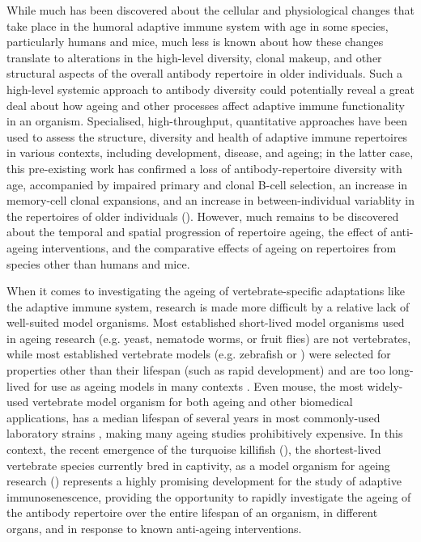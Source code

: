 While much has been discovered about the cellular and physiological changes that take place in the humoral adaptive immune system with age in some species, particularly humans and mice, much less is known about how these changes translate to alterations in the high-level diversity, clonal makeup, and other structural aspects of the overall antibody repertoire in older individuals. Such a high-level systemic approach to antibody diversity could potentially reveal a great deal about how ageing and other processes affect adaptive immune functionality in an organism. Specialised, high-throughput, quantitative approaches \parencite{georgiou2014promise} have been used to assess the structure, diversity and health of adaptive immune repertoires in various contexts, including development, disease, and ageing; in the latter case, this pre-existing work has confirmed a loss of antibody-repertoire diversity with age, accompanied by impaired primary and clonal B-cell selection, an increase in memory-cell clonal expansions, and an increase in between-individual variablity in the repertoires of older individuals (). However, much remains to be discovered about the temporal and spatial progression of repertoire ageing, the effect of anti-ageing interventions, and the comparative effects of ageing on repertoires from species other than humans and mice.

When it comes to investigating the ageing of vertebrate-specific adaptations like the adaptive immune system, research is made more difficult by a relative lack of well-suited model organisms. Most established short-lived model organisms used in ageing research (e.g. yeast, nematode worms, or fruit flies) are not vertebrates, while most established vertebrate models (e.g. zebrafish or ) were selected for properties other than their lifespan (such as rapid development) and are too long-lived for use as ageing models in many contexts \parencite{gerhard2002zebrafish,bowler1977longevity}. Even mouse, the most widely-used vertebrate model organism for both ageing and other biomedical applications, has a median lifespan of several years in most commonly-used laboratory strains \parencite{yuan2009aging}, making many ageing studies prohibitively expensive. In this context, the recent emergence of the turquoise killifish (\nfu), the shortest-lived vertebrate species currently bred in captivity, as a model organism for ageing research () represents a highly promising development for the study of adaptive immunosenescence, providing the opportunity to rapidly investigate the ageing of the antibody repertoire over the entire lifespan of an organism, in different organs, and in response to known anti-ageing interventions. 

